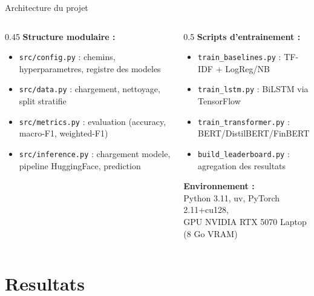 \documentclass[aspectratio=169, 11pt]{beamer}
\begin{document}
\begin{frame}{Architecture du projet}
  \begin{columns}[T]
    \begin{column}{0.45\textwidth}
      \textbf{Structure modulaire :}
      \begin{itemize}
        \item \texttt{src/config.py} : chemins, hyperparametres, registre des modeles
        \item \texttt{src/data.py} : chargement, nettoyage, split stratifie
        \item \texttt{src/metrics.py} : evaluation (accuracy, macro-F1, weighted-F1)
        \item \texttt{src/inference.py} : chargement modele, pipeline HuggingFace, prediction
      \end{itemize}
    \end{column}
    \begin{column}{0.5\textwidth}
      \textbf{Scripts d'entrainement :}
      \begin{itemize}
        \item \texttt{train\_baselines.py} : TF-IDF + LogReg/NB
        \item \texttt{train\_lstm.py} : BiLSTM via TensorFlow
        \item \texttt{train\_transformer.py} : BERT/DistilBERT/FinBERT
        \item \texttt{build\_leaderboard.py} : agregation des resultats
      \end{itemize}
      \vspace{0.3cm}
      \textbf{Environnement :}\\
      Python 3.11, uv, PyTorch 2.11+cu128,\\
      GPU NVIDIA RTX 5070 Laptop (8 Go VRAM)
    \end{column}
  \end{columns}
\end{frame}

\section{Resultats}
\end{document}
